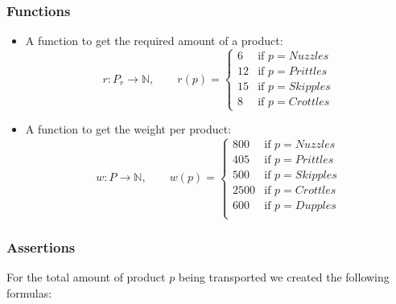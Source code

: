         \subsubsection{Functions}        
            \begin{itemize}
                \item 
                    A function to get the required amount of a product:
                    \[
                        r : P_r \to \mathbb{N},\qquad r(p) = \begin{cases}
                            6  & \text{if } p = Nuzzles  \\
                            12 & \text{if } p = Prittles \\
                            15 & \text{if } p = Skipples \\
                            8  & \text{if } p = Crottles
                        \end{cases}
                    \]
                \item 
                    A function to get the weight per product:
                    \[
                        w : P \to \mathbb{N},\qquad w(p) = \begin{cases}
                            800  & \text{if } p = Nuzzles  \\
                            405  & \text{if } p = Prittles \\
                            500  & \text{if } p = Skipples \\
                            2500 & \text{if } p = Crottles \\
                            600  & \text{if } p = Dupples \\
                        \end{cases}
                    \]
            \end{itemize}
        
        \subsubsection{Assertions}
            For the total amount of product $p$ being transported we created the
            following formulas:


